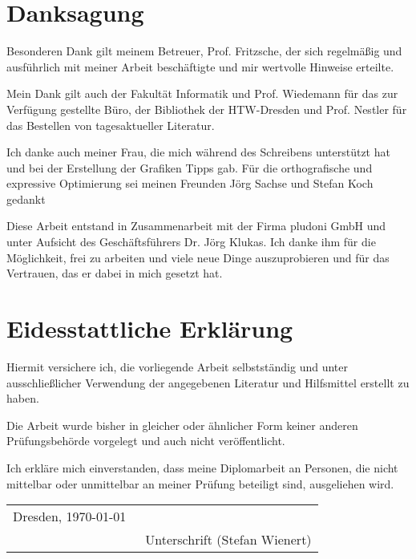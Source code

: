 \tableofcontents		%
\newpage
\chapter*{Danksagung}

Besonderen Dank gilt meinem Betreuer, Prof. Fritzsche, der sich regelmäßig und ausführlich mit meiner Arbeit beschäftigte und mir wertvolle Hinweise erteilte.

Mein Dank gilt auch der Fakultät Informatik und Prof. Wiedemann für das zur Verfügung gestellte Büro, der Bibliothek der HTW-Dresden und Prof. Nestler für das Bestellen von tagesaktueller Literatur.

Ich danke auch meiner Frau, die mich während des Schreibens unterstützt hat und bei der Erstellung der Grafiken Tipps gab. Für die orthografische und expressive Optimierung sei meinen Freunden Jörg Sachse und Stefan Koch gedankt

Diese Arbeit entstand in Zusammenarbeit mit der Firma pludoni GmbH und unter Aufsicht des Geschäftsführers Dr. Jörg Klukas. Ich danke ihm für die Möglichkeit, frei zu arbeiten und viele neue Dinge auszuprobieren und für das Vertrauen, das er dabei in mich gesetzt hat.

\newpage
\chapter*{Eidesstattliche Erklärung}
	Hiermit versichere ich, die vorliegende Arbeit selbstständig und unter ausschließlicher Verwendung
	der angegebenen Literatur und Hilfsmittel erstellt zu haben.

	Die Arbeit wurde bisher in gleicher oder ähnlicher Form keiner anderen Prüfungsbehörde vorgelegt
	und auch nicht veröffentlicht.\bigskip

Ich erkläre mich einverstanden, dass meine Diplomarbeit an Personen, die nicht mittelbar oder unmittelbar an meiner Prüfung beteiligt sind, ausgeliehen wird.\bigskip

\begin{tabular}{ll}

	Dresden, \today & \underline{\qquad \qquad \qquad \qquad \qquad \qquad}\\
	& \small{\ Unterschrift (Stefan Wienert)}
\end{tabular}


